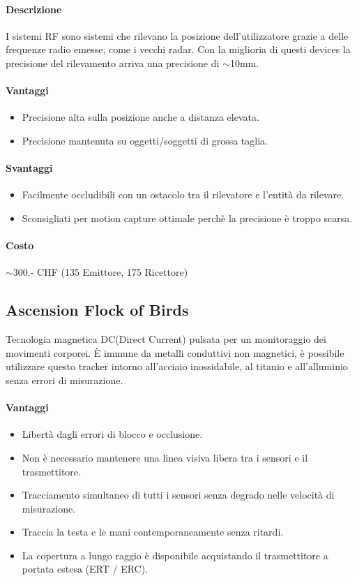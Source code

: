 \documentclass[8pt]{extarticle}
\begin{document}
\begin{multicols}{3}
\paragraph{Descrizione}
I sistemi RF sono sistemi che rilevano la posizione dell'utilizzatore grazie a delle 
frequenze radio emesse, come i vecchi radar. Con la miglioria di questi devices la 
precisione del rilevamento arriva una precisione di $\sim$10mm.
\paragraph{Vantaggi}
\begin{itemize}
    \item Precisione alta sulla posizione anche a distanza elevata.
    \item Precisione mantenuta su oggetti/soggetti di grossa taglia.
\end{itemize}
\paragraph{Svantaggi}
\begin{itemize}
    \item Facilmente occludibili con un ostacolo tra il rilevatore e l'entità da
    rilevare.
    \item Sconsigliati per motion capture ottimale perchè la precisione è troppo scarsa.
\end{itemize}
\paragraph{Costo} $\sim$300.- CHF (135 Emittore, 175 Ricettore) 

\subsection{Ascension Flock of Birds}
Tecnologia magnetica DC(Direct Current) pulsata per un monitoraggio dei movimenti corporei. È immune da metalli conduttivi non magnetici, è
possibile utilizzare questo tracker intorno all'acciaio inossidabile, al titanio e all'alluminio senza errori di misurazione.
\paragraph{Vantaggi}
\begin{itemize}
    \item Libertà dagli errori di blocco e occlusione.
    \item Non è necessario mantenere una linea visiva libera tra i sensori e il trasmettitore.
    \item Tracciamento simultaneo di tutti i sensori senza degrado nelle velocità di misurazione.
    \item Traccia la testa e le mani contemporaneamente senza ritardi.
    \item La copertura a lungo raggio è disponibile acquistando il trasmettitore a portata estesa (ERT / ERC).
\end{itemize}

\end{multicols}
\end{document}
